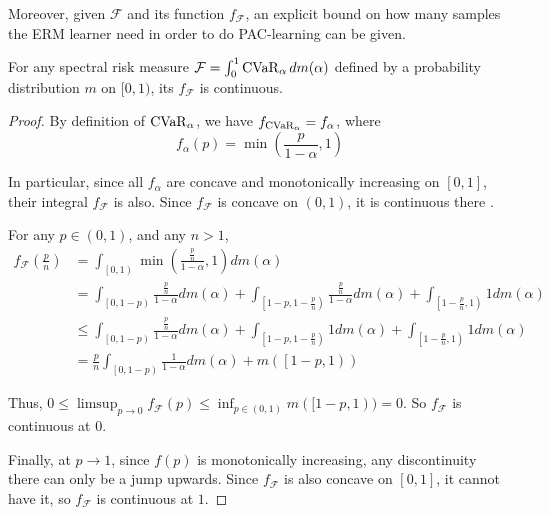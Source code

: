 Moreover, given $\mathcal{F}$ and its function $f_\mathcal{F}$, an explicit bound on how many samples the ERM learner need in order to do PAC-learning can be given.

\begin{lemma}
For any spectral risk measure $\mathcal{F} = \int_0^1 \operatorname{CVaR}_\alpha dm(\alpha)$ defined by a probability distribution $m$ on $[0, 1)$, its $f_\mathcal{F}$ is continuous.
\end{lemma}
\begin{proof}
By definition of $\operatorname{CVaR}_\alpha$, we have $f_{\operatorname{CVaR}_\alpha} = f_\alpha$, where 
$$f_\alpha(p) = \min{\left(\frac{p}{{{1}-\alpha}},{1}\right)}$$


In particular, since all $f_\alpha$ are concave and monotonically increasing on $[0, 1]$, their integral $f_\mathcal{F}$ is also. Since $f_\mathcal{F}$ is concave on $(0, 1)$, it is continuous there \cite[Theorem 1.5]{artinGammaFunction2015}.

For any $p\in(0, 1)$, and any $n > 1$, 
\begin{align*}
{{f}_{\mathcal{F}}{\left(\frac{p}{{n}}\right)}} &= \int_{{{\left[{0},{1}\right)}}}\min{\left(\frac{{\frac{p}{{n}}}}{{{1}-\alpha}},{1}\right)}{d}{m}{\left(\alpha\right)}\\
&= \int_{{{\left[{0},{1}-{p}\right)}}}\frac{{\frac{p}{{n}}}}{{{1}-\alpha}}{d}{m}{\left(\alpha\right)}+\int_{{{\left[{1}-{p},{1}-\frac{p}{{n}}\right)}}}{ \frac{{\frac{p}{{n}}}}{{{1}-\alpha}} }{d}{m}{\left(\alpha\right)}+\int_{{{\left[{1}-\frac{p}{{n}},{1}\right)}}}{1}{d}{m}{\left(\alpha\right)} \\
&\le \int_{{{\left[{0},{1}-{p}\right)}}}\frac{{\frac{p}{{n}}}}{{{1}-\alpha}}{d}{m}{\left(\alpha\right)}+\int_{{{\left[{1}-{p},{1}-\frac{p}{{n}}\right)}}}{1}{d}{m}{\left(\alpha\right)}+\int_{{{\left[{1}-\frac{p}{{n}},{1}\right)}}}{1}{d}{m}{\left(\alpha\right)} \\
&= \displaystyle\frac{p}{{n}}\int_{{{\left[{0},{1}-{p}\right)}}}\frac{1}{{{1}-\alpha}}{d}{m}{\left(\alpha\right)}+{m}{\left({\left[{1}-{p},{1}\right)}\right)}
\end{align*}

Thus, $0 \le \limsup_{p\to 0} f_\mathcal{F}(p)\le \inf_{p\in(0, 1)} m([1-p, 1)) = 0$. So $f_\mathcal{F}$ is continuous at $0$.

Finally, at $p\to 1$, since $f(p)$ is monotonically increasing, any discontinuity there can only be a jump upwards. Since $f_\mathcal{F}$ is also concave on $[0, 1]$, it cannot have it, so $f_\mathcal{F}$ is continuous at $1$.
\end{proof}

